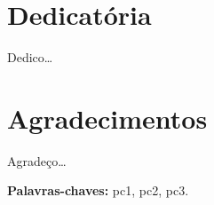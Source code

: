 \documentclass[12pt,times,a4paper,twoside]{icmc}
\begin{document}
      \thispagestyle{plain}
      \setcounter{page}{1}

      \chapter*{Dedicatória}

      Dedico\ldots

      \chapter*{Agradecimentos}

      Agradeço\ldots


      

      \noindent \textbf{Palavras-chaves:} pc1, pc2, pc3.

      \tableofcontents
      \listoffigures
      \listoftables
      \lstlistoflistings%
      \printglossary[title=Lista de Termos,toctitle=Termos e Abreviaturas]

      \onehalfspacing%

      \mainmatter%

      \renewcommand{\chaptermark}[1]{%

        \markboth{\chaptername\thechapter.\ #1}{}}  %

          \renewcommand{\sectionmark}[1]{%
            \markright{\thesection.\ #1}}

            
            
            
            


            \renewcommand{\bibname}{Referências}
            
            


            
\end{document}

